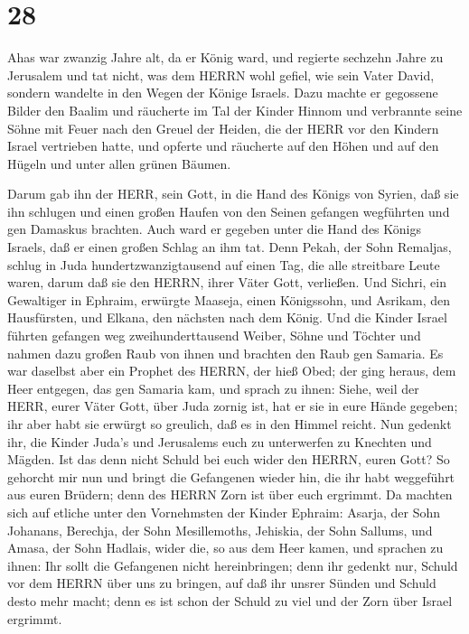 \hypertarget{section-27}{%
\section{28}\label{section-27}}

 Ahas war zwanzig Jahre alt, da er König ward, und regierte
sechzehn Jahre zu Jerusalem und tat nicht, was dem HERRN wohl gefiel,
wie sein Vater David,  sondern wandelte in den Wegen der
Könige Israels. Dazu machte er gegossene Bilder den Baalim 
und räucherte im Tal der Kinder Hinnom und verbrannte seine Söhne mit
Feuer nach den Greuel der Heiden, die der HERR vor den Kindern Israel
vertrieben hatte,  und opferte und räucherte auf den Höhen
und auf den Hügeln und unter allen grünen Bäumen.

 Darum gab ihn der HERR, sein Gott, in die Hand des Königs
von Syrien, daß sie ihn schlugen und einen großen Haufen von den Seinen
gefangen wegführten und gen Damaskus brachten. Auch ward er gegeben
unter die Hand des Königs Israels, daß er einen großen Schlag an ihm
tat.  Denn Pekah, der Sohn Remaljas, schlug in Juda
hundertzwanzigtausend auf einen Tag, die alle streitbare Leute waren,
darum daß sie den HERRN, ihrer Väter Gott, verließen.  Und
Sichri, ein Gewaltiger in Ephraim, erwürgte Maaseja, einen Königssohn,
und Asrikam, den Hausfürsten, und Elkana, den nächsten nach dem König.
 Und die Kinder Israel führten gefangen weg
zweihunderttausend Weiber, Söhne und Töchter und nahmen dazu großen Raub
von ihnen und brachten den Raub gen Samaria.  Es war
daselbst aber ein Prophet des HERRN, der hieß Obed; der ging heraus, dem
Heer entgegen, das gen Samaria kam, und sprach zu ihnen: Siehe, weil der
HERR, eurer Väter Gott, über Juda zornig ist, hat er sie in eure Hände
gegeben; ihr aber habt sie erwürgt so greulich, daß es in den Himmel
reicht.  Nun gedenkt ihr, die Kinder Juda's und Jerusalems
euch zu unterwerfen zu Knechten und Mägden. Ist das denn nicht Schuld
bei euch wider den HERRN, euren Gott?  So gehorcht mir nun
und bringt die Gefangenen wieder hin, die ihr habt weggeführt aus euren
Brüdern; denn des HERRN Zorn ist über euch ergrimmt.  Da
machten sich auf etliche unter den Vornehmsten der Kinder Ephraim:
Asarja, der Sohn Johanans, Berechja, der Sohn Mesillemoths, Jehiskia,
der Sohn Sallums, und Amasa, der Sohn Hadlais, wider die, so aus dem
Heer kamen,  und sprachen zu ihnen: Ihr sollt die
Gefangenen nicht hereinbringen; denn ihr gedenkt nur, Schuld vor dem
HERRN über uns zu bringen, auf daß ihr unsrer Sünden und Schuld desto
mehr macht; denn es ist schon der Schuld zu viel und der Zorn über
Israel ergrimmt.

